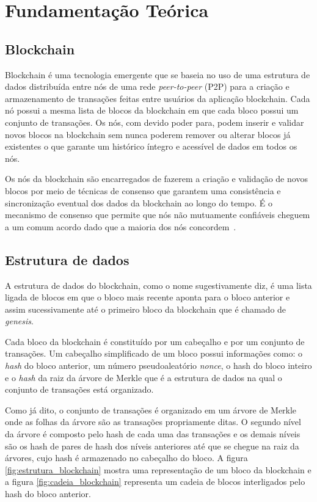 \documentclass[12pt]{article}
\begin{document}
\section{Fundamentação Teórica}

\subsection{Blockchain}

Blockchain é uma tecnologia emergente que se baseia no uso de uma estrutura de dados distribuída entre nós de uma rede \emph{peer-to-peer} (P2P) para a criação e armazenamento de transações feitas entre usuários da aplicação blockchain. Cada nó possui a mesma lista de blocos da blockchain em que cada bloco possui um conjunto de transações. Os nós, com devido poder para, podem inserir e validar novos blocos na blockchain sem nunca poderem remover ou alterar blocos já existentes o que garante um histórico íntegro e acessível de dados em todos os nós.

Os nós da blockchain são encarregados de fazerem a criação e validação de novos blocos por meio de técnicas de consenso que garantem uma consistência e sincronização eventual dos dados da blockchain ao longo do tempo. É o mecanismo de consenso que permite que nós não mutuamente confiáveis cheguem a um comum acordo dado que a maioria dos nós concordem~\cite{braga2017segurancca}.

\subsection{Estrutura de dados}

A estrutura de dados do blockchain, como o nome sugestivamente diz, é uma lista ligada de blocos em que o bloco mais recente aponta para o bloco anterior e assim sucessivamente até o primeiro bloco da blockchain que é chamado de \emph{genesis}.

Cada bloco da blockchain é constituído por um cabeçalho e por um conjunto de transações. Um cabeçalho simplificado de um bloco possui informações como: o \emph{hash} do bloco anterior, um número pseudoaleatório \emph{nonce}, o hash do bloco inteiro e o \emph{hash} da raiz da árvore de Merkle que é a estrutura de dados na qual o conjunto de transações está organizado.

Como já dito, o conjunto de transações é organizado em um árvore de Merkle onde as folhas da árvore são as transações propriamente ditas. O segundo nível da árvore é composto pelo hash de cada uma das transações e os demais níveis são os hash de pares de hash dos níveis anteriores até que se chegue na raiz da árvores, cujo hash é armazenado no cabeçalho do bloco. A figura \ref{fig:estrutura_blockchain} mostra uma representação de um bloco da blockchain e a figura \ref{fig:cadeia_blockchain} representa um cadeia de blocos interligados pelo hash do bloco anterior.
\end{document}
